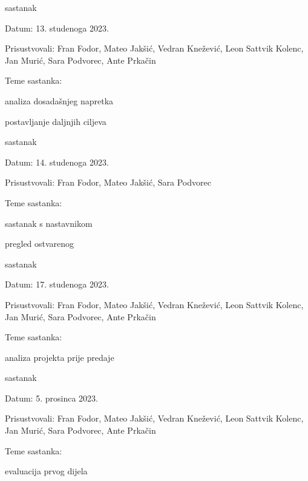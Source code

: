 \begin{packed_enum}
			\item  sastanak
			\item[] \begin{packed_item}
				\item Datum: {13. studenoga 2023.}
				\item Prisustvovali: {Fran Fodor, Mateo Jakšić, Vedran Knežević, Leon Sattvik Kolenc, Jan Murić, Sara Podvorec, Ante Prkačin}
				\item Teme sastanka:
				\begin{packed_item}
					\item  analiza dosadašnjeg napretka
					\item  postavljanje daljnjih ciljeva
				\end{packed_item}
			\end{packed_item}

			\item  sastanak
			\item[] \begin{packed_item}
				\item Datum: {14. studenoga 2023.}
				\item Prisustvovali: {Fran Fodor, Mateo Jakšić, Sara Podvorec}
				\item Teme sastanka:
				\begin{packed_item}
					\item  sastanak s nastavnikom
					\item  pregled ostvarenog
				\end{packed_item}
			\end{packed_item}

			\item  sastanak
			\item[] \begin{packed_item}
				\item Datum: {17. studenoga 2023.}
				\item Prisustvovali: {Fran Fodor, Mateo Jakšić, Vedran Knežević, Leon Sattvik Kolenc, Jan Murić, Sara Podvorec, Ante Prkačin}
				\item Teme sastanka:
				\begin{packed_item}
					\item  analiza projekta prije predaje
				\end{packed_item}
			\end{packed_item}

			\item  sastanak
			\item[] \begin{packed_item}
				\item Datum: {5. prosinca 2023.}
				\item Prisustvovali: {Fran Fodor, Mateo Jakšić, Vedran Knežević, Leon Sattvik Kolenc, Jan Murić, Sara Podvorec, Ante Prkačin}
				\item Teme sastanka:
				\begin{packed_item}
					\item  evaluacija prvog dijela
				\end{packed_item}
			\end{packed_item}


\end{packed_enum}
